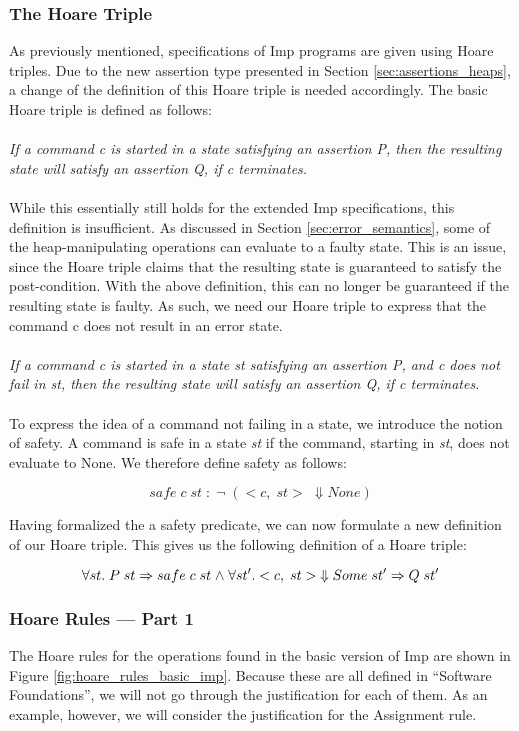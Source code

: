 \subsubsection{The Hoare Triple}
As previously mentioned, specifications of Imp programs are given using Hoare triples. Due to the new assertion type presented in Section \ref{sec:assertions_heaps}, a change of the definition of this Hoare triple is needed accordingly. The basic Hoare triple is defined as follows:
\\
\\
\textit{If a command c is started in a state satisfying an assertion P, then the resulting state will satisfy an assertion Q, if c terminates.}
\\
\\
While this essentially still holds for the extended Imp specifications, this definition is insufficient. As discussed in Section \ref{sec:error_semantics}, some of the heap-manipulating operations can evaluate to a faulty state. This is an issue, since the Hoare triple claims that the resulting state is guaranteed to satisfy the post-condition. With the above definition, this can no longer be guaranteed if the resulting state is faulty. As such, we need our Hoare triple to  express that the command c does not result in an error state.
\\
\\
\textit{If a command c is started in a state st satisfying an assertion P, and c does not fail in st, then the resulting state will satisfy an assertion Q, if c terminates.}
\\
\\
To express the idea of a command not failing in a state, we introduce the notion of safety. A command is safe in a state {\it st} if the command, starting in {\it st}, does not evaluate to None. We therefore define safety as follows:

\[ \mathit{safe\;c\;st\;: \;\neg \;(<c,\;st>\;\Downarrow None)}\]

Having formalized the a safety predicate, we can now formulate a new definition of our Hoare triple. This gives us the following definition of a Hoare triple:

\[
\forall st.\; P\;st \Rightarrow safe\;c\;st \mathrel{\wedge} \forall st'. <c,\;st>\;\Downarrow Some\; st' \Rightarrow Q\;st'
\]
\subsubsection{Hoare Rules --- Part 1}
The Hoare rules for the operations found in the basic version of Imp are shown in Figure \ref{fig:hoare_rules_basic_imp}. Because these are all defined in ``Software Foundations'', we will not go through the justification for each of them. As an example, however, we will consider the justification for the Assignment rule.

